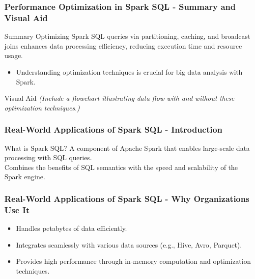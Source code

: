 \documentclass[aspectratio=169]{beamer}
\begin{document}
\begin{frame}[fragile]
    \frametitle{Performance Optimization in Spark SQL - Summary and Visual Aid}
    \begin{block}{Summary}
        Optimizing Spark SQL queries via partitioning, caching, and broadcast joins enhances data processing efficiency, reducing execution time and resource usage. 
    \end{block}
    
    \begin{itemize}
        \item Understanding optimization techniques is crucial for big data analysis with Spark.
    \end{itemize}
    
    \begin{block}{Visual Aid}
        \textit{(Include a flowchart illustrating data flow with and without these optimization techniques.)}
    \end{block}
\end{frame}

\begin{frame}[fragile]
    \frametitle{Real-World Applications of Spark SQL - Introduction}
    \begin{block}{What is Spark SQL?}
        A component of Apache Spark that enables large-scale data processing with SQL queries.\\
        Combines the benefits of SQL semantics with the speed and scalability of the Spark engine.
    \end{block}
\end{frame}

\begin{frame}[fragile]
    \frametitle{Real-World Applications of Spark SQL - Why Organizations Use It}
    \begin{itemize}
        \item Handles petabytes of data efficiently.
        \item Integrates seamlessly with various data sources (e.g., Hive, Avro, Parquet).
        \item Provides high performance through in-memory computation and optimization techniques.
    \end{itemize}
\end{frame}
\end{document}
